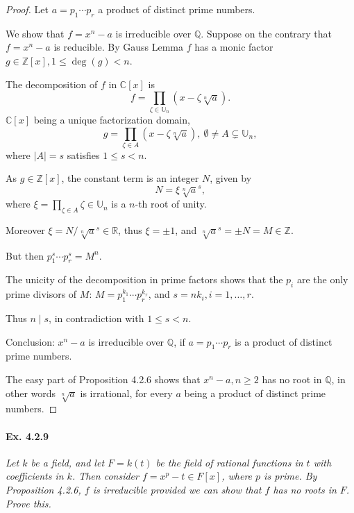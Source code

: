 \documentclass[11pt,a4paper]{article}
\newcommand{\Q}{\mathbb{Q}}
\newcommand{\C}{\mathbb{C}}
\begin{document}
\begin{proof}
Let $a= p_1\cdots p_r$ a product of distinct prime numbers.

We show that $f = x^n -a$ is irreducible over $\Q$. Suppose on the contrary that $f = x^n -a$ is reducible. By Gauss Lemma $f$ has a monic factor $g \in \mathbb{Z}[x], 1\leq \deg(g) <n$. 

The decomposition of $f$ in $\C[x]$ is
 $$f =\prod_{\zeta \in \mathbb{U}_n} ( x - \zeta \sqrt[n]{a}).$$ 
 $\mathbb{C}[x]$ being a unique factorization domain, $$g = \prod_{\zeta \in A} ( x - \zeta \sqrt[n]{a}),\ \emptyset \neq A \varsubsetneq \mathbb{U}_n,$$
where $\vert A \vert =s$ satisfies $1\leq s <n$.

As $g \in \mathbb{Z}[x]$, the constant term is an integer $N$, given by
$$N = \xi \sqrt[n] {a}^s,$$ where $\xi = \prod_{\zeta \in A} \zeta \in \mathbb{U}_n$ is a $n$-th root of unity.

Moreover $\xi = N/\sqrt[n] {a}^s \in \mathbb{R}$, thus $\xi = \pm1$, and $\sqrt[n] {a}^s = \pm N =M\in \mathbb{Z}$.

But then $p_1^s\cdots p_r^s = M^n$.

The unicity of the decomposition in prime factors shows that the $p_i$ are the only prime divisors of $M$: $M = p_1^{k_1}\cdots p_r^{k_r}$, and $s = nk_i, i=1,\ldots,r$.

Thus $n\mid s$, in contradiction with $1\leq s <n$.

Conclusion: $x^n -a$ is irreducible over $\mathbb{Q}$, if $a = p_1\cdots p_r$ is a product of distinct prime numbers.

\bigskip

The easy part of Proposition 4.2.6 shows that $x^n-a, n\geq 2$ has no root in  $\mathbb{Q}$, in other words $\sqrt[n]{a}$ is irrational, for every $a$ being a product of distinct prime numbers.
\end{proof}

\paragraph{Ex. 4.2.9}

{\it Let $k$ be a field, and let $F = k(t)$ be the field of rational functions in $t$ with coefficients in $k$. Then consider $f = x^p-t \in F[x]$, where $p$ is prime. By Proposition 4.2.6, $f$ is irreducible provided we can show that $f$ has no roots in $F$. Prove this.
}
\end{document}
